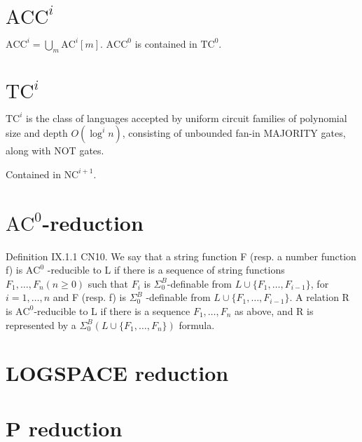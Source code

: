 \section{$\text{ACC}^i$}
$\text{ACC}^i = \bigcup_m \text{AC}^i[m]$. $\text{ACC}^0$ is contained in $\text{TC}^0$.

\section{$\text{TC}^i$}
$\text{TC}^i$ is the class of languages accepted by uniform circuit families 
of polynomial size and depth $O(\log^i n)$, consisting of unbounded fan-in MAJORITY
gates, along with NOT gates.

Contained in $\text{NC}^{i + 1}$.

\section{$\text{AC}^0$-reduction}
\label{sec:ac0red}
Definition IX.1.1 CN10. We say that a string function F
(resp. a number function f) is $\text{AC}^0$ -reducible to L if there is a sequence
of string functions $F_1, \dots, F_n (n \geqslant 0)$ such that
$F_i$ is $\Sigma^B_0$-definable from $L \cup \{F_1, \dots , F_{i-1}\}$, for $i = 1, \dots, n$
and F (resp. f) is $\Sigma^B_0$ -definable from $L \cup \{F_1, \dots , F_{i-1}\}$. A relation R is
$\text{AC}^0$-reducible to L if there is a sequence $F_1, \dots, F_n$ as above, and R is
represented by a $\Sigma^B_0(L \cup \{F_1, \dots, F_n\})$ formula.

\section{LOGSPACE reduction}

\section{P reduction}

